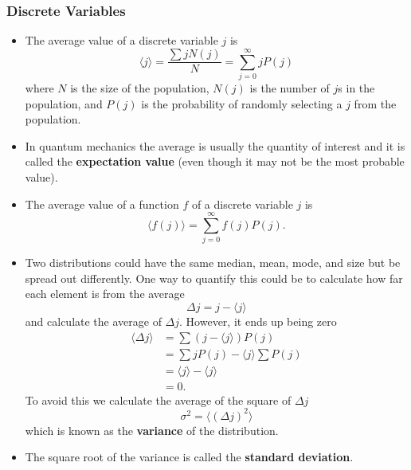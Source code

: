\documentclass{article}
\begin{document}
\subsubsection{Discrete Variables}

\begin{itemize}
  \item The average value of a discrete variable $j$ is \[\langle j \rangle = \frac{\sum j N(j)}{N} = \sum_{j = 0}^\infty j P(j)\] where $N$ is the size of the population, $N(j)$ is the number of $j$s in the population, and $P(j)$ is the probability of randomly selecting a $j$ from the population.

  \item In quantum mechanics the average is usually the quantity of interest and it is called the \textbf{expectation value} (even though it may not be the most probable value).

  \item The average value of a function $f$ of a discrete variable $j$ is \[\langle f(j) \rangle = \sum_{j = 0}^\infty f(j) P(j).\]

  \item Two distributions could have the same median, mean, mode, and size but be spread out differently. One way to quantify this could be to calculate how far each element is from the average \[\Delta j = j - \langle j \rangle\] and calculate the average of $\Delta j$. However, it ends up being zero \begin{align*}
          \langle \Delta j \rangle & = \sum (j - \langle j \rangle) P(j)         \\
                                   & = \sum j P(j) - \langle j \rangle \sum P(j) \\
                                   & = \langle j \rangle - \langle j \rangle     \\
                                   & = 0.
        \end{align*} To avoid this we calculate the average of the square of $\Delta j$ \[\sigma^2 = \langle (\Delta j)^2 \rangle\] which is known as the \textbf{variance} of the distribution.

  \item The square root of the variance is called the \textbf{standard deviation}.


\end{itemize}
\end{document}
